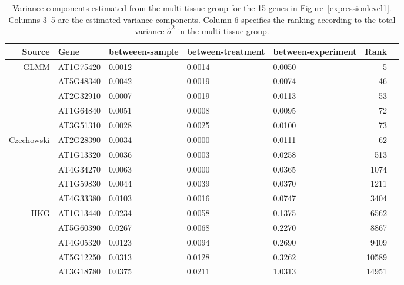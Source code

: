 		\begin{table}[]
			\centering
			\caption{Variance components estimated from the multi-tissue group for
				the 15 genes in Figure~\ref{expressionlevel1}.
				Columns 3--5 are the estimated
				variance components. Column 6 specifies the ranking according to the
				total variance $\hat{\sigma}^2$ in the multi-tissue group.}
			\label{table:15genes}
			\begin{tabular}{rp{2cm}p{2cm}p{2cm}p{2cm}rp{1cm}}\\ \hline
				Source                        & Gene      & betweeen-sample & between-treatment & between-experiment & Rank  \\  \hline
				\multirow{5}{*}{GLMM}   
				& AT1G75420 & 0.0012 & 0.0014 & 0.0050 & 5 \\ 
				& AT5G48340 & 0.0042 & 0.0019 & 0.0074 & 46 \\ 
				& AT2G32910 & 0.0007 & 0.0019 & 0.0113 & 53 \\ 
				& AT1G64840 & 0.0051 & 0.0008 & 0.0095 & 72 \\ 
				& AT3G51310 & 0.0028 & 0.0025 & 0.0100 & 73 \\ \hline
				
				\multirow{5}{*}{Czechowski}  & AT2G28390 & 0.0034 & 0.0000 & 0.0111 & 62 \\ 
				& AT1G13320 & 0.0036 & 0.0003 & 0.0258 & 513 \\ 
				& AT4G34270 & 0.0063 & 0.0000 & 0.0365 & 1074 \\ 
				& AT1G59830 & 0.0044 & 0.0039 & 0.0370 & 1211 \\ 
				& AT4G33380 & 0.0103 & 0.0016 & 0.0747 & 3404 \\ \hline
				
				\multirow{5}{*}{HKG}    & AT1G13440 & 0.0234 & 0.0058 & 0.1375 & 6562 \\ 
				& AT5G60390 & 0.0267 & 0.0068 & 0.2270 & 8867 \\ 
				& AT4G05320 & 0.0123 & 0.0094 & 0.2690 & 9409 \\ 
				& AT5G12250 & 0.0313 & 0.0128 & 0.3262 & 10589 \\ 
				& AT3G18780 & 0.0375 & 0.0211 & 1.0313 & 14951 \\ \hline 
			\end{tabular}
		\end{table}
		
		
